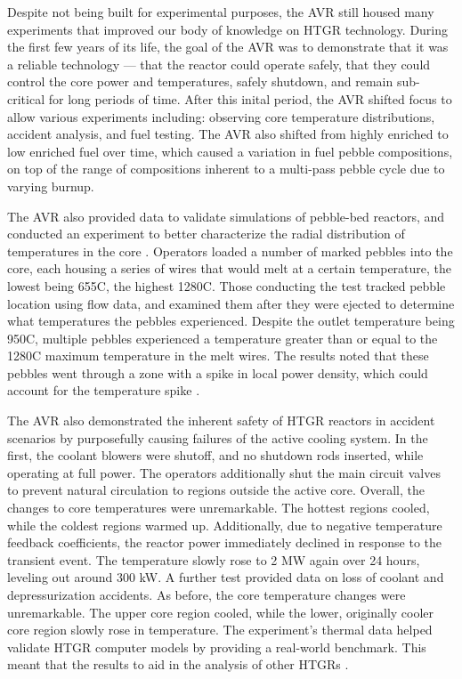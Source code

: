 Despite not being built for experimental purposes, the AVR still housed many experiments that improved our body of knowledge on HTGR technology.  During the first few years of its life, the goal of the AVR was to demonstrate that it was a reliable technology --- that the reactor could operate safely, that they could control the core power and temperatures, safely shutdown, and remain sub-critical for long periods of time.  After this inital period, the AVR shifted focus to allow various experiments including: observing core temperature distributions, accident analysis, and fuel testing.  The AVR also shifted from highly enriched to low enriched fuel over time, which caused a variation in fuel pebble compositions, on top of the range of compositions inherent to a multi-pass pebble cycle due to varying burnup.

The AVR also provided data to validate simulations of pebble-bed reactors, and conducted an experiment to better characterize the radial distribution of temperatures in the core \cite{noauthor_results_1990}.  Operators loaded a number of marked pebbles into the core, each housing a series of wires that would melt at a certain temperature, the lowest being 655\textdegree  C, the highest 1280\textdegree  C.  Those conducting the test tracked pebble location using flow data, and examined them after they were ejected to determine what temperatures the pebbles experienced.  Despite the outlet temperature being 950\textdegree  C, multiple pebbles experienced a temperature greater than or equal to the 1280\textdegree C maximum temperature in the melt wires.  The results noted that these pebbles went through a zone with a spike in local power density, which could account for the temperature spike \cite{noauthor_results_1990}.

The AVR also demonstrated the inherent safety of HTGR reactors in accident scenarios by purposefully causing failures of the active cooling system.  In the first, the coolant blowers were shutoff, and no shutdown rods inserted, while operating at full power.  The operators additionally shut the main circuit valves to prevent natural circulation to regions outside the active core.  Overall, the changes to core temperatures were unremarkable.  The hottest regions cooled, while the coldest regions warmed up.  Additionally, due to negative temperature feedback coefficients, the reactor power immediately declined in response to the transient event.  The temperature slowly rose to 2 MW again over 24 hours, leveling out around 300 kW.  A further test provided data on loss of coolant and depressurization accidents.  As before, the core temperature changes were unremarkable.  The upper core region cooled, while the lower, originally cooler core region slowly rose in temperature.  The experiment's thermal data helped validate HTGR computer models by providing a real-world benchmark.  This meant that the results to aid in the analysis of other HTGRs \cite{noauthor_results_1990}.

